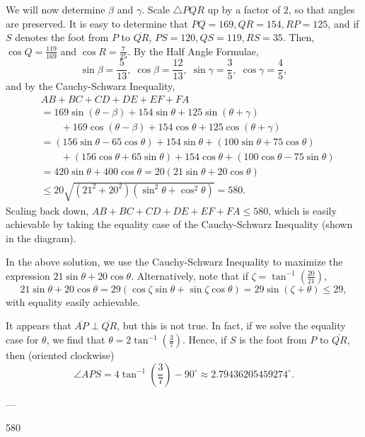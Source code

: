 We will now determine $\beta$ and $\gamma$. Scale $\triangle PQR$ up by a factor of $2$, so that angles are preserved. It is easy to determine that $PQ=169,QR=154,RP=125$, and if $S$ denotes the foot from $P$ to $\overline{QR}$, $PS=120,QS=119,RS=35$. Then, $\cos Q=\tfrac{119}{169}$ and $\cos R=\tfrac7{25}$. By the Half Angle Formulae, \[\sin\beta=\frac5{13},\;\cos\beta=\frac{12}{13},\;\sin\gamma=\frac35,\;\cos\gamma=\frac45,\]
and by the Cauchy-Schwarz Inequality,
\begin{align*}
    &AB+BC+CD+DE+EF+FA\\
    &=169\sin(\theta-\beta)+154\sin\theta+125\sin(\theta+\gamma)\\
    &\qquad+169\cos(\theta-\beta)+154\cos\theta+125\cos(\theta+\gamma)\\
    &=(156\sin\theta-65\cos\theta)+154\sin\theta+(100\sin\theta+75\cos\theta)\\
    &\qquad+(156\cos\theta+65\sin\theta)+154\cos\theta+(100\cos\theta-75\sin\theta)\\
    &=420\sin\theta+400\cos\theta=20(21\sin\theta+20\cos\theta)\\
    &\le 20\sqrt{(21^2+20^2)(\sin^2\theta+\cos^2\theta)}=580.
\end{align*}
Scaling back down, $AB+BC+CD+DE+EF+FA\le 580$, which is easily achievable by taking the equality case of the Cauchy-Schwarz Inequality (shown in the diagram).
\begin{alternative}
    In the above solution, we use the Cauchy-Schwarz Inequality to maximize the expression $21\sin\theta+20\cos\theta$. Alternatively, note that if $\zeta=\tan^{-1}(\tfrac{20}{21})$, \[21\sin\theta+20\cos\theta=29(\cos\zeta\sin\theta+\sin\zeta\cos\theta)=29\sin(\zeta+\theta)\le 29,\]
    with equality easily achievable.
\end{alternative}
\begin{boxremark}
    It appears that $\overline{AP}\perp\overline{QR}$, but this is not true. In fact, if we solve the equality case for $\theta$, we find that $\theta=2\tan^{-1}(\tfrac37)$. Hence, if $S$ is the foot from $P$ to $\overline{QR}$, then (oriented clockwise) \[\angle APS=4\tan^{-1}\left(\frac37\right)-90^\circ\approx 2.79436205459274^\circ.\]
\end{boxremark}

---

580
